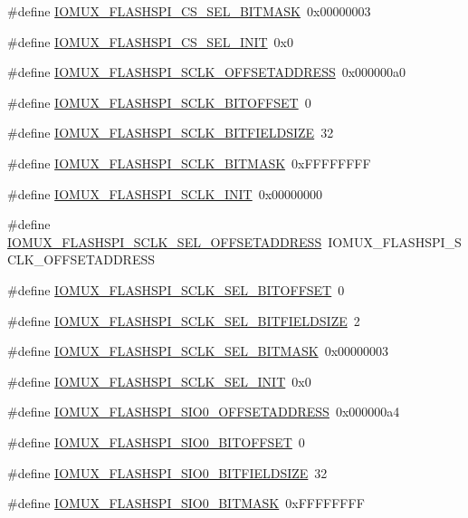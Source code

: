 \begin{DoxyCompactItemize}
\item 
\#define \hyperlink{a00560_a68c55170f35883d09e1cd2d88d0e76b5}{IOMUX\_\-FLASHSPI\_\-CS\_\-SEL\_\-BITMASK}~0x00000003
\item 
\#define \hyperlink{a00560_ab5b8cd8e45c4bec3da34fe18e5ffd942}{IOMUX\_\-FLASHSPI\_\-CS\_\-SEL\_\-INIT}~0x0
\item 
\#define \hyperlink{a00560_a2319d2cbd04557d58d561f6ea7161cf1}{IOMUX\_\-FLASHSPI\_\-SCLK\_\-OFFSETADDRESS}~0x000000a0
\item 
\#define \hyperlink{a00560_a6130f9b68c40da356f58c6f198ae3c14}{IOMUX\_\-FLASHSPI\_\-SCLK\_\-BITOFFSET}~0
\item 
\#define \hyperlink{a00560_a0ba46edeb9e94be4dc5ad34d8544fbaf}{IOMUX\_\-FLASHSPI\_\-SCLK\_\-BITFIELDSIZE}~32
\item 
\#define \hyperlink{a00560_ad7c0648ef2287210b9b38e9f4a4621aa}{IOMUX\_\-FLASHSPI\_\-SCLK\_\-BITMASK}~0xFFFFFFFF
\item 
\#define \hyperlink{a00560_a3468e3c04bf89303c0f36f374bb4140c}{IOMUX\_\-FLASHSPI\_\-SCLK\_\-INIT}~0x00000000
\item 
\#define \hyperlink{a00560_a0e07f78df3e670e096d34e8078bf6cc0}{IOMUX\_\-FLASHSPI\_\-SCLK\_\-SEL\_\-OFFSETADDRESS}~IOMUX\_\-FLASHSPI\_\-SCLK\_\-OFFSETADDRESS
\item 
\#define \hyperlink{a00560_a59e216553b2524612b3d52209eeaa307}{IOMUX\_\-FLASHSPI\_\-SCLK\_\-SEL\_\-BITOFFSET}~0
\item 
\#define \hyperlink{a00560_a7a19648acb12448b323d5d0d9c52daad}{IOMUX\_\-FLASHSPI\_\-SCLK\_\-SEL\_\-BITFIELDSIZE}~2
\item 
\#define \hyperlink{a00560_ab77778026fc21fae9af2a09aa1822559}{IOMUX\_\-FLASHSPI\_\-SCLK\_\-SEL\_\-BITMASK}~0x00000003
\item 
\#define \hyperlink{a00560_a45fe2de65226b9c890d065c04cd6f5ad}{IOMUX\_\-FLASHSPI\_\-SCLK\_\-SEL\_\-INIT}~0x0
\item 
\#define \hyperlink{a00560_a7d334e9984ab28fc9a719e4b36a9ae81}{IOMUX\_\-FLASHSPI\_\-SIO0\_\-OFFSETADDRESS}~0x000000a4
\item 
\#define \hyperlink{a00560_aefe97c2691405266aea1d820f0726bc6}{IOMUX\_\-FLASHSPI\_\-SIO0\_\-BITOFFSET}~0
\item 
\#define \hyperlink{a00560_a78cd3503efb2080d09b29763efb1b29c}{IOMUX\_\-FLASHSPI\_\-SIO0\_\-BITFIELDSIZE}~32
\item 
\#define \hyperlink{a00560_a4d8c5d78397eef6dbc6b72f6b8592af6}{IOMUX\_\-FLASHSPI\_\-SIO0\_\-BITMASK}~0xFFFFFFFF
\item 

\end{DoxyCompactItemize}
